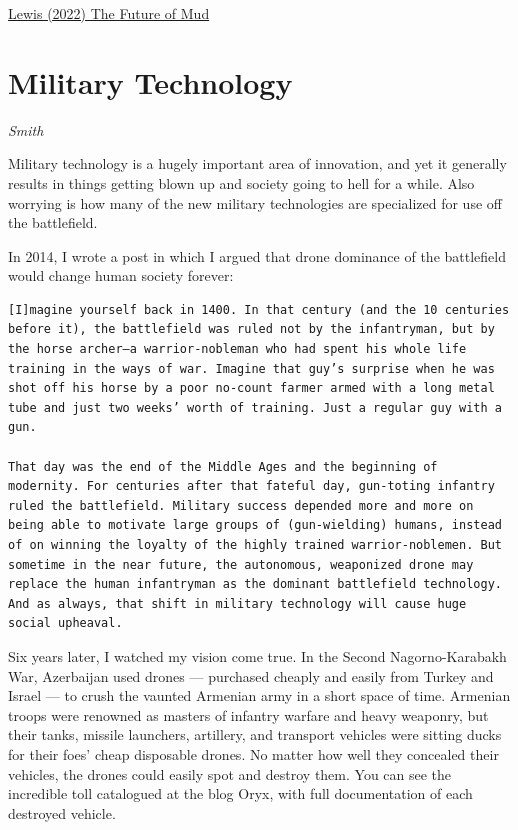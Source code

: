 \documentclass[
]{book}
\begin{document}
\href{https://www.theatlantic.com/science/archive/2022/07/senegal-dakar-construction-mud-architecture/661405/}{Lewis (2022) The Future of Mud}

\hypertarget{military-technology}{%
\chapter{Military Technology}\label{military-technology}}

\emph{Smith}

Military technology is a hugely important area of innovation, and yet it generally results in things getting blown up and society going to hell for a while.
Also worrying is how many of the new military technologies are specialized for use off the battlefield.

In 2014, I wrote a post in which I argued that drone dominance of the battlefield would change human society forever:

\begin{verbatim}
[I]magine yourself back in 1400. In that century (and the 10 centuries before it), the battlefield was ruled not by the infantryman, but by the horse archer—a warrior-nobleman who had spent his whole life training in the ways of war. Imagine that guy’s surprise when he was shot off his horse by a poor no-count farmer armed with a long metal tube and just two weeks’ worth of training. Just a regular guy with a gun.

That day was the end of the Middle Ages and the beginning of modernity. For centuries after that fateful day, gun-toting infantry ruled the battlefield. Military success depended more and more on being able to motivate large groups of (gun-wielding) humans, instead of on winning the loyalty of the highly trained warrior-noblemen. But sometime in the near future, the autonomous, weaponized drone may replace the human infantryman as the dominant battlefield technology. And as always, that shift in military technology will cause huge social upheaval.
\end{verbatim}

Six years later, I watched my vision come true. In the Second Nagorno-Karabakh War, Azerbaijan used drones --- purchased cheaply and easily from Turkey and Israel --- to crush the vaunted Armenian army in a short space of time. Armenian troops were renowned as masters of infantry warfare and heavy weaponry, but their tanks, missile launchers, artillery, and transport vehicles were sitting ducks for their foes' cheap disposable drones. No matter how well they concealed their vehicles, the drones could easily spot and destroy them. You can see the incredible toll catalogued at the blog Oryx, with full documentation of each destroyed vehicle.
\end{document}
